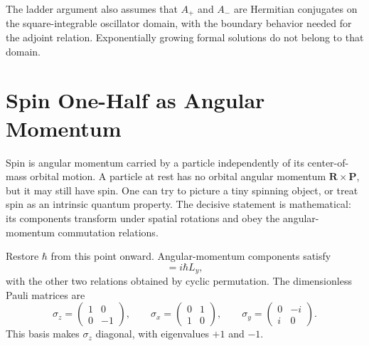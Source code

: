 \begin{classroomqa}
\end{classroomqa}

The ladder argument also assumes that \(A_{+}\) and \(A_{-}\) are Hermitian conjugates on the square-integrable oscillator domain, with the boundary behavior needed for the adjoint relation. Exponentially growing formal solutions do not belong to that domain.

\begin{classroomqa}
\end{classroomqa}

\section{Spin One-Half as Angular Momentum}

Spin is angular momentum carried by a particle independently of its center-of-mass orbital motion. A particle at rest has no orbital angular momentum \(\mathbf R\times\mathbf P\), but it may still have spin. One can try to picture a tiny spinning object, or treat spin as an intrinsic quantum property. The decisive statement is mathematical: its components transform under spatial rotations and obey the angular-momentum commutation relations.

Restore \(\hbar\) from this point onward. Angular-momentum components satisfy
\begin{equation}
[L_{z},L_{x}]=i\hbar L_{y},
\end{equation}
with the other two relations obtained by cyclic permutation. The dimensionless Pauli matrices are
\begin{equation}
\sigma_{z}=
\begin{pmatrix}
1&0\\
0&-1
\end{pmatrix},
\qquad
\sigma_{x}=
\begin{pmatrix}
0&1\\
1&0
\end{pmatrix},
\qquad
\sigma_{y}=
\begin{pmatrix}
0&-i\\
i&0
\end{pmatrix}.
\end{equation}
This basis makes \(\sigma_{z}\) diagonal, with eigenvalues \(+1\) and \(-1\).

